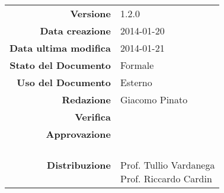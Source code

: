 
\newcommand{\Versione}{1.2.0}						%
\newcommand{\Data}{2014-01-20}						%
\newcommand{\DataUltimaModifica}{2014-01-21}
\newcommand{\TipoDocumento}{Verbale esterno 2014-01-20}		%




\begin{center}
\begin{tabular}{r|l}
\textbf{Versione} & \Versione{} \\
\textbf{Data creazione} & \Data{} \\
\textbf{Data ultima modifica} & \DataUltimaModifica{} \\
\textbf{Stato del Documento} & Formale \\		%
\textbf{Uso del Documento} & Esterno \\			%
\textbf{Redazione} & Giacomo Pinato\\				%
\textbf{Verifica} & \\		%
\textbf{Approvazione} & \\		%
\textbf{Distribuzione} & \parbox[t]{4cm}{\NomeGruppo{} \\Prof. Tullio Vardanega \\ Prof. Riccardo Cardin \\ \Prop{} }\\
\end{tabular}
\end{center}

\vspace{0.05in}

\begin{abstract}
\begin{center}
Verbale della riunione di gruppo del 2014-01-20.
\end{center}
\end{abstract}

